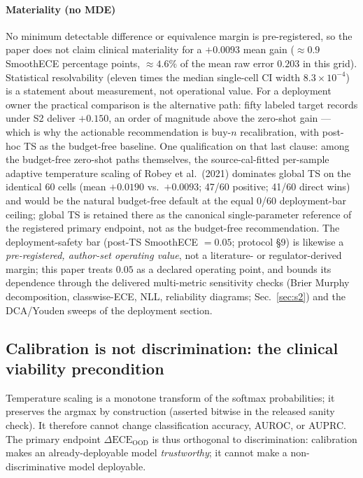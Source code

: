 \documentclass[review,12pt,nonatbib]{elsarticle}
\begin{document}
\paragraph{Materiality (no MDE)} No minimum detectable difference or
equivalence margin is pre-registered, so the paper does not claim
clinical materiality for a $+0.0093$ mean gain ($\approx 0.9$
SmoothECE percentage points, $\approx 4.6\%$ of the mean raw error
$0.203$ in this grid). Statistical resolvability (eleven times the
median single-cell CI width $8.3\times10^{-4}$) is a statement about
measurement, not operational value. For a deployment owner the
practical comparison is the alternative path: fifty labeled target
records under S2 deliver $+0.150$, an order of magnitude above the
zero-shot gain --- which is why the actionable recommendation is
buy-$n$ recalibration, with post-hoc TS as the budget-free baseline.
One qualification on that last clause: among the budget-free
zero-shot paths themselves, the source-cal-fitted per-sample adaptive
temperature scaling of Robey et al.\ (2021) dominates global TS on the
identical 60 cells (mean $+0.0190$ vs.\ $+0.0093$; 47/60 positive;
41/60 direct wins) and would be the natural budget-free default at the
equal 0/60 deployment-bar ceiling; global TS is retained there as the
canonical single-parameter reference of the registered primary
endpoint, not as the budget-free recommendation.
    The deployment-safety bar (post-TS SmoothECE $=0.05$; protocol
    \S9) is likewise a \emph{pre-registered, author-set operating
    value}, not a literature- or regulator-derived margin; this paper
    treats $0.05$ as a declared operating point, and bounds its
    dependence through the delivered multi-metric sensitivity checks
    (Brier Murphy decomposition, classwise-ECE, NLL, reliability
    diagrams; Sec.~\ref{sec:s2}) and the DCA/Youden sweeps of the
    deployment section.

\subsection{Calibration is not discrimination: the clinical viability precondition}
Temperature scaling is a monotone transform of the softmax
probabilities; it preserves the argmax by construction (asserted
bitwise in the released sanity check). It therefore cannot change
classification accuracy, AUROC, or AUPRC. The primary endpoint
$\Delta\text{ECE}_{\text{OOD}}$ is thus orthogonal to discrimination:
calibration makes an already-deployable model \emph{trustworthy}; it
cannot make a non-discriminative model deployable.
\end{document}
